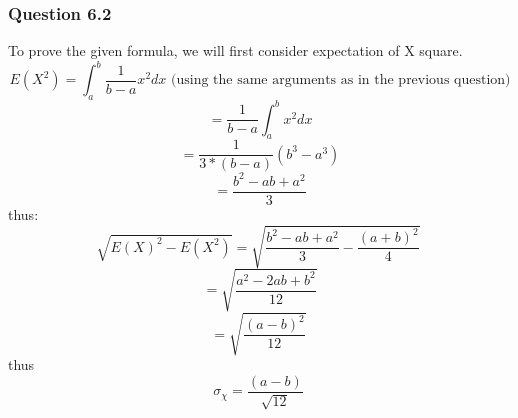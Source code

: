 \documentclass[a4paper,10pt]{article}
\begin{document}
	\subsubsection{Question 6.2 }
	To prove the given formula, we will first consider expectation of X square.
	\begin{equation} E(X^2) = \int_a^b \frac{1}{b-a}x^2dx \mbox{ (using the same arguments as in the previous question)}\end{equation}
	\begin{equation}        = \frac{1}{b-a} \int_a^b x^2dx \end{equation}
	\begin{equation}        = \frac{1}{3*(b-a)} (b^3 - a^3) \end{equation}
	\begin{equation}        = \frac{b^2 - ab + a^2}{3} \end{equation}
	thus:
	\begin{equation} \sqrt{E(X)^2 - E(X^2)} = \sqrt{\frac{b^2 - ab + a^2}{3} - \frac{(a+b)^2}{4}}\ \end{equation}
	\begin{equation}                         = \sqrt{\frac{a^2 - 2ab + b^2}{12}} \end{equation}
	\begin{equation}                         = \sqrt{\frac{(a - b)^2}{12}}\ \end{equation}
	thus
	\begin{equation} \sigma_{\chi}            = \frac{(a - b)}{\sqrt{12}}\ \end{equation}
\end{document}
